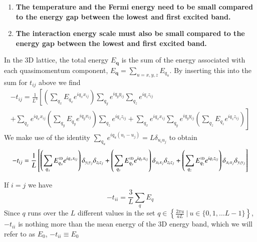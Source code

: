\documentclass[oneside,11pt]{memoir}
\newcommand{\bv}[1]{\ensuremath{\bm{#1}}}
\begin{document}
\begin{enumerate}
\item \textbf{The temperature and the Fermi energy need to be small compared to
the energy gap between the lowest and first excited band.}

\item \textbf{The interaction energy scale must also be small compared to the
energy gap between the lowest and first excited band.}
\end{enumerate}

In the 3D lattice, the total energy $E_{\bv{q}}$ is the sum of the energy
associated with each quasimomentum component, $E_{\bv{q}} = \sum_{u=x,y,z}
E_{q_{u}} $.  By inserting this into the sum for $t_{ij}$ above we find 
\begin{multline}
-t_{ij} =  \frac{1}{L^{3}} \left[ 
          \left(\sum_{q_{x}} E_{q_{x}}   e^{ i q_{x} x_{ij} }   \right)
          \sum_{q_{y}} e^{ i q_{y} y_{ij} }   
          \sum_{q_{z}} e^{ i q_{z} z_{ij} }  
   \right. \\
\left. 
          + 
          \sum_{q_{x}} e^{ i q_{x} x_{ij} }  
          \left(\sum_{q_{y}} E_{q_{y}}   e^{ i q_{y} x_{ij} }   \right)
          \sum_{q_{z}} e^{ i q_{z} z_{ij} }  
          + 
          \sum_{q_{x}} e^{ i q_{x} x_{ij} }  
          \sum_{q_{y}} e^{ i q_{y} y_{ij} }   
          \left(\sum_{q_{z}} E_{q_{z}}   e^{ i q_{z} z_{ij} }   \right)
\right]
\end{multline}
We make use of the identity $\sum_{q_{u}} e^{ iq_{u}(u_{i}-u_{j}) } = L \delta_{u_{i}u_{j}}$ to obtain
\begin{equation}
-t_{ij} =  \frac{1}{L} \left[ 
          \left(\sum_{q_{x}} E_{q_{x}}^{\text{\tiny 1D}}   e^{ i q_{x} x_{ij} }   \right)
          \delta_{y_{i}y_{j}}
          \delta_{z_{i}z_{j}}
          + 
          \left(\sum_{q_{y}} E_{q_{y}}^{\text{\tiny 1D}}   e^{ i q_{y} x_{ij} }   \right)
          \delta_{x_{i}x_{j}}
          \delta_{z_{i}z_{j}}
          + 
          \left(\sum_{q_{z}} E_{q_{z}}^{\text{\tiny 1D}}   e^{ i q_{z} z_{ij} }   \right)
          \delta_{x_{i}x_{j}}
          \delta_{y_{i}y_{j}}
\right]
\label{eq:tunnelinglong}
\end{equation}

If $i=j$ we have 
\begin{equation}
  -t_{ii} =  \frac{3}{L} 
          \sum_{q} E_{q} 
\end{equation}
Since $q$ runs over the $L$ different values in the set $q \in \left\lbrace
\frac{2\pi u}{a L} \ |\  u \in \lbrace 0,1,\ldots L-1 \rbrace \right\rbrace$,
$-t_{ii}$ is nothing more than the mean energy of the 3D energy band, which we will refer to as $E_{0}$,  $-t_{ii}\equiv E_{0}$  
\end{document}
